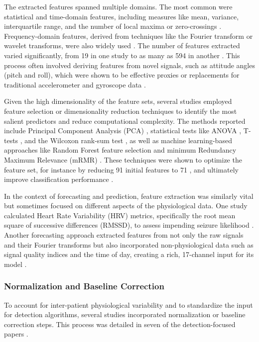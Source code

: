 The extracted features spanned multiple domains. The most common were statistical and time-domain features, including measures like mean, variance, interquartile range, and the number of local maxima or zero-crossings \cite{Milosevic2016-ee, De_Cooman2018-pq, Dong2022-oo, Wang2025-my}. Frequency-domain features, derived from techniques like the Fourier transform or wavelet transforms, were also widely used \cite{Poh2012-af, Chowdhury2022-bi, De_Cooman2018-pq, Vakilna2024-hk}. The number of features extracted varied significantly, from 19 in one study \cite{Poh2012-af} to as many as 594 in another \cite{Larsen2024-vn}. This process often involved deriving features from novel signals, such as attitude angles (pitch and roll), which were shown to be effective proxies or replacements for traditional accelerometer and gyroscope data \cite{Wang2025-ql}.

Given the high dimensionality of the feature sets, several studies employed feature selection or dimensionality reduction techniques to identify the most salient predictors and reduce computational complexity. The methods reported include Principal Component Analysis (PCA) \cite{Chowdhury2022-bi}, statistical tests like ANOVA \cite{Dong2022-oo}, T-tests \cite{Ge2023-ab}, and the Wilcoxon rank-sum test \cite{Vakilna2024-hk}, as well as machine learning-based approaches like Random Forest feature selection \cite{Xu2022-tx} and minimum Redundancy Maximum Relevance (mRMR) \cite{Ge2023-ab}. These techniques were shown to optimize the feature set, for instance by reducing 91 initial features to 71 \cite{Xu2022-tx}, and ultimately improve classification performance \cite{Ge2023-ab}.

In the context of forecasting and prediction, feature extraction was similarly vital but sometimes focused on different aspects of the physiological data. One study calculated Heart Rate Variability (HRV) metrics, specifically the root mean square of successive differences (RMSSD), to assess impending seizure likelihood \cite{Vieluf2023-zv}. Another forecasting approach extracted features from not only the raw signals and their Fourier transforms but also incorporated non-physiological data such as signal quality indices and the time of day, creating a rich, 17-channel input for its model \cite{Meisel2020-ii}.


\subsubsection{Normalization and Baseline Correction}
To account for inter-patient physiological variability and to standardize the input for detection algorithms, several studies incorporated normalization or baseline correction steps. This process was detailed in seven of the detection-focused papers \cite{Nasseri2021-xn, Jiang2022-zu, Hegarty-Craver2021-hk, Cogan2017-lg, Ge2023-ab, Milosevic2016-ee, Wang2025-ql}.

